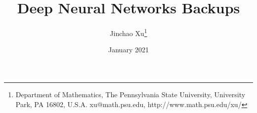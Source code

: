 \documentclass[leqno,labelfig,psfigt,colorlinks]{svmono}
\begin{document}
	
	\title{\huge Deep Neural Networks Backups}
	\author{Jinchao Xu\footnote{
			Department of Mathematics,
			The Pennsylvania State University, University Park, PA 16802,
			U.S.A. xu@math.psu.edu,  http://www.math.psu.edu/xu/}}
	\date{January 2021}
	
	\maketitle 
	
	\tableofcontents
	
		
	
	
	
	
	
	
\end{document}

